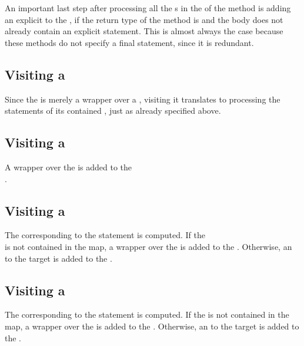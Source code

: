 An important last step after processing all the s in the  of the method is adding
an explicit  to the , if the return type of the method is  and the
body does not already contain an explicit  statement. This is almost always the case because these methods
do not specify a final  statement, since it is redundant.

\subsection{Visiting a }
Since the  is merely a wrapper over a , visiting it translates to processing
the statements of its contained , just as already specified above.

\subsection{Visiting a }

A  wrapper over the  is added to the\\
.

\subsection{Visiting a }

The  corresponding to the  statement is computed. If the\\
 is not contained in the  map, a  wrapper over
the  is added to the . Otherwise, an  to
the target  is added to the .

\subsection{Visiting a }

The  corresponding to the  statement is computed. If the 
is not contained in the  map, a  wrapper over the 
is added to the . Otherwise, an  to the target  is added
to the .

